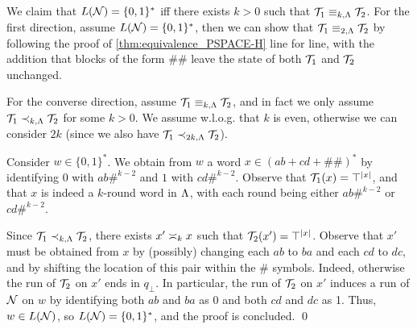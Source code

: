 We claim that $L(\cN)=\{0,1\}^*$ iff there exists $k>0$ such that $\cT_1\equiv_{k,\fL}\cT_2$.
For the first direction, assume $L(\cN)=\{0,1\}^*$, then we can show that $\cT_1\equiv_{2,\fL}\cT_2$ by following the proof of \autoref{thm:equivalence_PSPACE-H} line for line, with the addition that blocks of the form $\#\#$ leave the state of both $\cT_1$ and $\cT_2$ unchanged.

For the converse direction, assume $\cT_1\equiv_{k,\fL}\cT_2$, and in fact we only assume $\cT_1\prec_{k,\fL}\cT_2$ for some $k>0$. We assume w.l.o.g. that $k$ is even, otherwise we can consider $2k$ (since we also have $\cT_1\prec_{2k,\fL}\cT_2$).

Consider $w\in \{0,1\}^*$. We obtain from $w$ a word $x\in (ab+cd+\#\#)^*$ by identifying $0$ with $ab\#^{k-2}$ and $1$ with $cd\#^{k-2}$. Observe that $\cT_1(x)=\top^{|x|}$, and that $x$ is indeed a $k$-round word in $\fL$, with each round being either $ab\#^{k-2}$ or $cd\#^{k-2}$. 

Since $\cT_1\prec_{k,\fL}\cT_2$, there exists $x'\req[k]x$ such that $\cT_2(x')=\top^{|x|}$. Observe that $x'$ must be obtained from $x$ by (possibly) changing each $ab$ to $ba$ and each $cd$ to $dc$, and by shifting the location of this pair within the $\#$ symbols. Indeed, otherwise the run of $\cT_2$ on $x'$ ends in $q_{\bot}$.
In particular, the run of $\cT_2$ on $x'$ induces a run of $\cN$ on $w$ by identifying both $ab$ and $ba$ as 0 and both $cd$ and $dc$ as 1. Thus, $w\in L(\cN)$, so $L(\cN)=\{0,1\}^*$, and the proof is concluded. \qed

